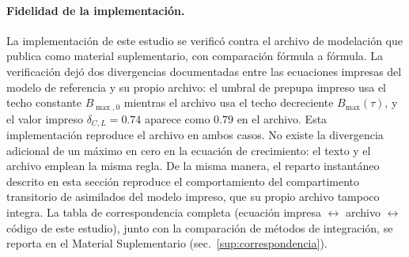 \paragraph{Fidelidad de la implementación.}
La implementación de este estudio se verificó contra el archivo de modelación que \citeauthor{eriksenDynamicModellingFeed2022} publica como material suplementario, con comparación fórmula a fórmula. La verificación dejó dos divergencias documentadas entre las ecuaciones impresas del modelo de referencia y su propio archivo: el umbral de prepupa impreso usa el techo constante $B_{\max,0}$ mientras el archivo usa el techo decreciente $B_{\max}(\tau)$, y el valor impreso $\delta_{C,L} = 0.74$ aparece como $0.79$ en el archivo. Esta implementación reproduce el archivo en ambos casos. No existe la divergencia adicional de un máximo en cero en la ecuación de crecimiento: el texto y el archivo emplean la misma regla. De la misma manera, el reparto instantáneo descrito en esta sección reproduce el comportamiento del compartimento transitorio de asimilados del modelo impreso, que su propio archivo tampoco integra. La tabla de correspondencia completa (ecuación impresa $\leftrightarrow$ archivo $\leftrightarrow$ código de este estudio), junto con la comparación de métodos de integración, se reporta en el Material Suplementario (sec.~\ref{sup:correspondencia}).
